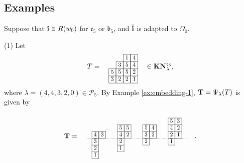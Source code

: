 \documentclass[leqno,11pt]{amsart}
\numberwithin{equation}{section}
\newcommand{\bs}{\boldsymbol}
\newcommand{\cP}{\mathscr{P}}
\newcommand{\ov}{\overline}
\newcommand{\bi}{\bs{\rm i}}
\newcommand{\mf}{\mathfrak}
\newcommand{\la}{\lambda}
\begin{document}
\subsection{Examples}\label{sec:examples}
Suppose that $\bi\in R(w_0)$ for $\mf c_5$ or $\mf b_5$, and $\ov{\bi}$ is adapted to $\Omega_0$.

(1) Let  \vskip 2mm
$$
T=\quad
\resizebox{.12\hsize}{!}
{\def\lr#1{\multicolumn{1}{|@{\hspace{.75ex}}c@{\hspace{.75ex}}|}{\raisebox{-.04ex}{$#1$}}}\raisebox{-.6ex}
{$\begin{array}{cccc}
\cline{3-3}\cline{4-4}
& & \lr{1} &\lr{4}\\
\cline{2-2}\cline{3-3}\cline{4-4}
& \lr{3} & \lr{5} &\lr{\ov 4}\\
\cline{1-1}\cline{2-2}\cline{3-3}\cline{4-4}
\lr{5}&\lr{\ov 5} & \lr{\ov 5}&\lr{\ov 2}\\
\cline{1-1}\cline{2-2}\cline{3-3}\cline{4-4}
\lr{\ov 3}&\lr{\ov 2} & \lr{\ov 2}&\lr{\ov 1}\\
\cline{1-1}\cline{2-2}\cline{3-3}\cline{4-4}
\end{array}$}}\quad  \in {\bf KN}^{\mf c_5}_{\la}, 
$$ \vskip 3mm
\noindent where $\la=(4,4,3,2,0)\in \cP_5$. 
By Example \ref{ex:embedding-1}, ${\bf T}=\Psi_\la(T)$ is given by
$${\bf T} =\quad  
\resizebox{.42\hsize}{!}
{\def\lr#1{\multicolumn{1}{|@{\hspace{.75ex}}c@{\hspace{.75ex}}|}{\raisebox{-.04ex}{$#1$}}}\raisebox{-.6ex}
{$\begin{array}{ccccccccccccccccc}
\\
\cline{14-14}\cline{15-15}
& & & & & & & & & & & & & \lr{\ov{5}} & \lr{\ov{3}} \\
\cline{6-6}\cline{7-7}\cline{10-11}\cline{14-15}
& & & & & \lr{\ov{5}} &  \lr{\ov{5}} & &  & \lr{\ov{5}}&\lr{\ov{4}} & & & \lr{\ov{4}} &  \lr{\ov{2}}\\
\cline{2-3}\cline{6-7}\cline{10-11}\cline{14-15}
& \lr{\ov{4}} & \lr{\ov{3}}& & & \lr{\ov{4}} & \lr{\ov{2}} & & & \lr{\ov{3}} & \lr{\ov{2}}& & & \lr{\ov{2}} &  \lr{\ov{1}}& \\
\cline{2-3}\cdashline{1-5}[0.5pt/1pt]\cline{6-7}\cdashline{8-11}[0.5pt/1pt]
\cline{10-11}\cdashline{12-16}[0.5pt/1pt]\cline{14-15}
& \lr{\ov{3}} & & & & \lr{\ov{2}} & & &  & \lr{\ov{2}} & & & & \lr{\ov{1}} & \\
\cline{2-2}\cline{6-6}\cline{10-10}\cline{14-14}
& \lr{\ov{2}} & & & & \lr{\ov{1}} & \\
\cline{2-2}\cline{6-6}
& \lr{\ov{1}} \\
\cline{2-2}\\
\end{array}$}} \quad .
$$ 
\end{document}

